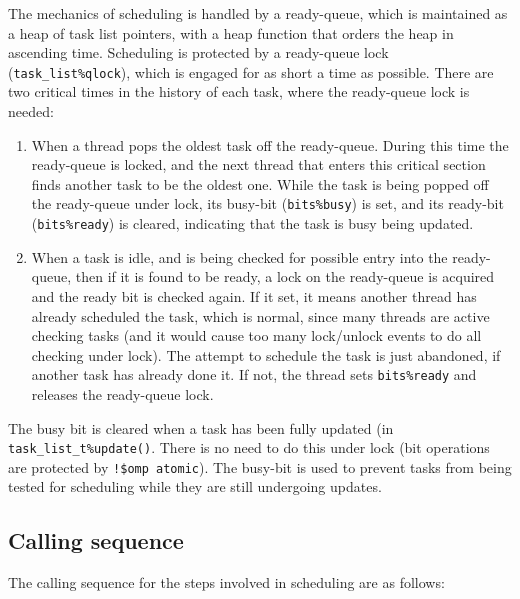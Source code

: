 \documentclass[paper=a4,fontsize=11pt]{scrartcl}
\numberwithin{equation}{section}		%
\numberwithin{figure}{section}			%
\numberwithin{table}{section}				%
\newcommand{\codecolor}{\color{Blue}}
\newcommand{\Code}[1]{{\codecolor\texttt{#1}}}
\begin{document}
The mechanics of scheduling is handled by a ready-queue, which is maintained as a heap of task list pointers, with a heap function that orders the heap in ascending time.  Scheduling is protected by a ready-queue lock (\Code{task\_list\%qlock}), which is engaged for as short a time as possible.  There are two critical times in the history of each task, where the ready-queue lock is needed:
\begin{enumerate}
    \item When a thread pops the oldest task off the ready-queue.  During this time the ready-queue is locked, and the next thread that enters this critical section finds another task to be the oldest one.  While the task is being popped off the ready-queue under lock, its busy-bit (\Code{bits\%busy}) is set, and its ready-bit (\Code{bits\%ready}) is cleared, indicating that the task is busy being updated.
    \item When a task is idle, and is being checked for possible entry into the ready-queue, then if it is found to be ready, a lock on the ready-queue is acquired and the ready bit is checked again.  If it set, it means another thread has already scheduled the task, which is normal, since many threads are active checking tasks (and it would cause too many lock/unlock events to do all checking under lock).  The attempt to schedule the task is just abandoned, if another task has already done it.  If not, the thread sets \Code{bits\%ready} and releases the ready-queue lock.
\end{enumerate}
The busy bit is cleared when a task has been fully updated (in \Code{task\_list\_t\%update()}.  There is no need to do this under lock (bit operations are protected by \Code{!\$omp atomic}).  The busy-bit is used to prevent tasks from being tested for scheduling while they are still undergoing updates.

\subsection{Calling sequence}
The calling sequence for the steps involved in scheduling are as follows:
\end{document}
